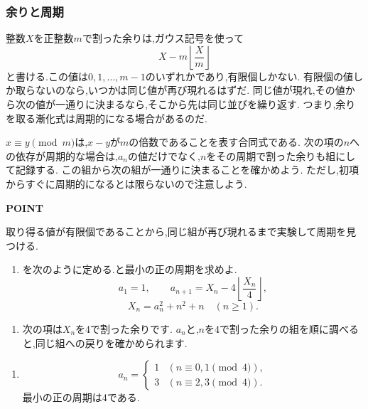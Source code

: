 \subsubsection{余りと周期}\label{節：余りと周期}
整数$X$を正整数$m$で割った余りは,ガウス記号を使って
\[
  X-m\left\lfloor\frac Xm\right\rfloor
\]
と書ける.この値は$0,1,\ldots,m-1$のいずれかであり,有限個しかない.
有限個の値しか取らないのなら,いつかは同じ値が再び現れるはずだ.
同じ値が現れ,その値から次の値が一通りに決まるなら,そこから先は同じ並びを繰り返す.
つまり,余りを取る漸化式は周期的になる場合があるのだ.

$x\equiv y\pmod m$は,$x-y$が$m$の倍数であることを表す合同式である.
次の項の$n$への依存が周期的な場合は,$a_n$の値だけでなく,$n$をその周期で割った余りも組にして記録する.
この組から次の組が一通りに決まることを確かめよう.
ただし,初項からすぐに周期的になるとは限らないので注意しよう.

\begin{bookpoint}
  \textbf{POINT}\par
  取り得る値が有限個であることから,同じ組が再び現れるまで実験して周期を見つける.
\end{bookpoint}

\noindent {}\par\nobreak
\begin{enumerate}[label=(\arabic*),parsep=3pt,beginpenalty=10000,format=\bookitemlink{example-gauss-role-3}{problem}{hint}]
  \item {}を次のように定める.と最小の正の周期を求めよ.
    \[
      a_1=1,\qquad
      a_{n+1}=X_n-4\left\lfloor\frac{X_n}{4}\right\rfloor,
    \]
    \[
      X_n=a_n^2+n^2+n\quad(n\ge1).
    \]
\end{enumerate}

\noindent {}\par\nobreak
\begin{enumerate}[label=(\arabic*),parsep=3pt,beginpenalty=10000,format=\bookitemlink{example-gauss-role-3}{hint}{answer}]
  \item 次の項は$X_n$を4で割った余りです.
    $a_n$と,$n$を4で割った余りの組を順に調べると,同じ組への戻りを確かめられます.
\end{enumerate}

\noindent {}\par\nobreak
\begin{enumerate}[label=(\arabic*),parsep=3pt,beginpenalty=10000,format=\bookitemlink{example-gauss-role-3}{answer}{solution}]
  \item \[
      a_n=
      \begin{cases}
        1 & (n\equiv0,1\pmod4),\\
        3 & (n\equiv2,3\pmod4).
      \end{cases}
    \]
    最小の正の周期は4である.
\end{enumerate}

